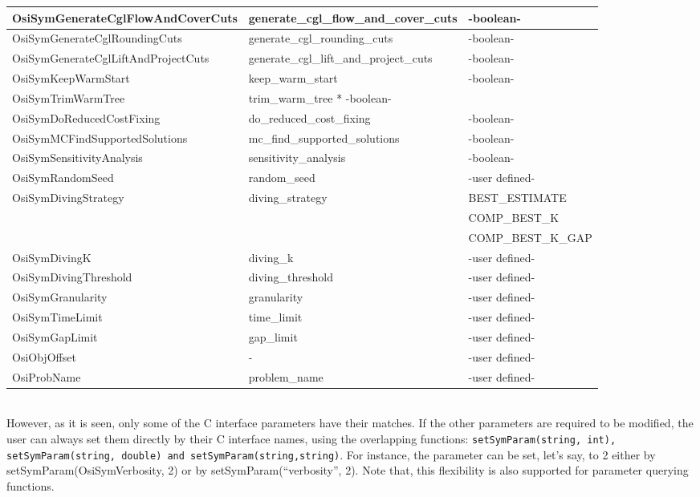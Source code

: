 {\begin{tabular}{|l||l||l|}
\hline \hline
OsiSymGenerateCglFlowAndCoverCuts & generate\_cgl\_flow\_and\_cover\_cuts & -boolean- \\
\hline \hline
OsiSymGenerateCglRoundingCuts & generate\_cgl\_rounding\_cuts & -boolean- \\
\hline \hline
OsiSymGenerateCglLiftAndProjectCuts & generate\_cgl\_lift\_and\_project\_cuts & -boolean- \\
\hline \hline
OsiSymKeepWarmStart & keep\_warm\_start & -boolean- \\
\hline \hline
OsiSymTrimWarmTree & trim\_warm\_tree * -boolean- \\
\hline \hline
OsiSymDoReducedCostFixing & do\_reduced\_cost\_fixing & -boolean- \\
\hline \hline
OsiSymMCFindSupportedSolutions & 
mc\_find\_supported\_solutions & -boolean- \\
\hline \hline
OsiSymSensitivityAnalysis & sensitivity\_analysis & -boolean- \\
\hline \hline
OsiSymRandomSeed & random\_seed & -user defined-\\
\hline \hline
OsiSymDivingStrategy & diving\_strategy & BEST\_ESTIMATE \\
& & COMP\_BEST\_K \\
& & COMP\_BEST\_K\_GAP \\
\hline \hline
OsiSymDivingK & diving\_k & -user defined- \\
\hline \hline
OsiSymDivingThreshold & diving\_threshold & -user defined- \\
\hline \hline
OsiSymGranularity & granularity & -user defined- \\
\hline \hline
OsiSymTimeLimit & time\_limit & -user defined- \\
\hline \hline   
OsiSymGapLimit & gap\_limit & -user defined- \\
\hline \hline
OsiObjOffset & - & -user defined- \\
\hline \hline
OsiProbName & problem\_name & -user defined- \\
\hline 
\end{tabular}
} \\

However, as it is seen, only some of the C interface parameters have their 
matches. If the other parameters are required to be modified, the user 
can always set them directly by their C interface names, 
using the overlapping functions: {\tt setSymParam(string, int), 
setSymParam(string, double) and setSymParam(string,string)}. For instance, 
the  parameter can be set, let's say, to 2 either by 
setSymParam(OsiSymVerbosity, 2) or by setSymParam(``verbosity'', 2). 
Note that, this flexibility is also supported for parameter querying 
functions. 
